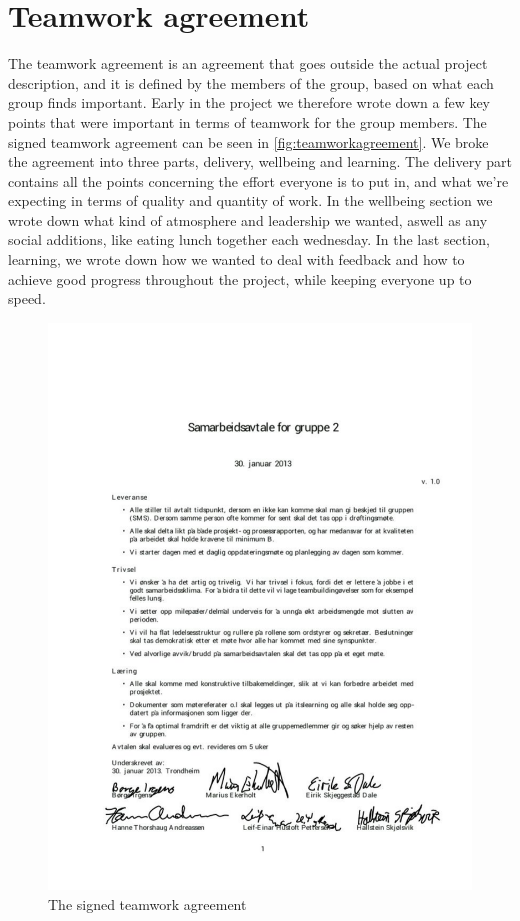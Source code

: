 \section{Teamwork agreement}
The teamwork agreement is an agreement that goes outside the actual project description, and it is defined by the members of the group, based on what each group finds important. Early in the project we therefore wrote down a few key points that were important in terms of teamwork for the group members. The signed teamwork agreement can be seen in \autoref{fig:teamworkagreement}. We broke the agreement into three parts, delivery, wellbeing and learning. The delivery part contains all the points concerning the effort everyone is to put in, and what we're expecting in terms of quality and quantity of work. In the wellbeing section we wrote down what kind of atmosphere and leadership we wanted, aswell as any social additions, like eating lunch together each wednesday. In the last section, learning, we wrote down how we wanted to deal with feedback and how to achieve good progress throughout the project, while keeping everyone up to speed.

\begin{figure}
	\begin{center}
		\includegraphics[width=1.0\textwidth]{Figures/teamworkagreement.pdf}
	\end{center}
	\caption[Teamwork agreement]{The signed teamwork agreement}
	\label{fig:teamworkagreement}
\end{figure}